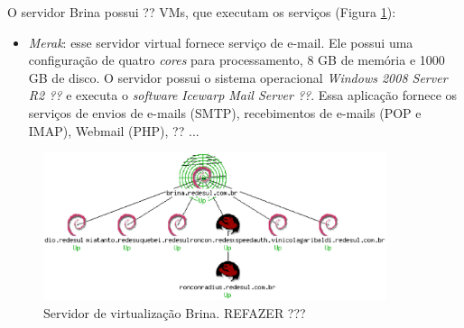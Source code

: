 O servidor Brina possui ?? \ac{VM}s, que executam os serviços (Figura \ref{fig:servlog1}):
\begin{itemize}
 \item \textit{Merak}: esse servidor virtual fornece serviço de e-mail. Ele possui uma configuração de quatro \textit{cores} para processamento, 
 8 GB de memória e 1000 GB de disco. O servidor possui o sistema operacional \textit{Windows 2008 Server R2 ??} e executa o \textit{software} 
 \textit{Icewarp Mail Server ??}. Essa aplicação fornece os serviços de envios de e-mails (\ac{SMTP}), recebimentos de e-mails (\ac{POP} e 
 \ac{IMAP}), Webmail (\ac{PHP}), ?? ... %

\end{itemize}

\begin{figure}[h!]
 \centering
 \includegraphics[width=380px]{img/servlog1.eps}
 \caption{Servidor de virtualização Brina. REFAZER ???}
 \label{fig:servlog1}
\end{figure}

